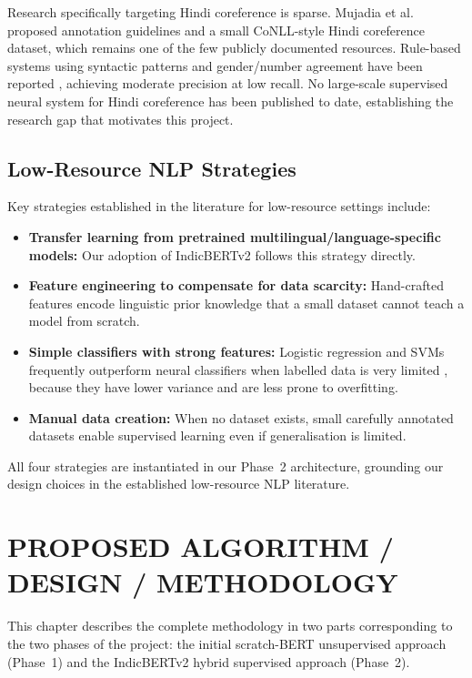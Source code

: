 \documentclass[12pt,a4paper]{report}
\begin{document}
Research specifically targeting Hindi coreference is sparse. Mujadia et al.\ \cite{mujadia2016hindi} proposed annotation guidelines and a small CoNLL-style Hindi coreference dataset, which remains one of the few publicly documented resources. Rule-based systems using syntactic patterns and gender/number agreement have been reported \cite{dakwale2013anaphora}, achieving moderate precision at low recall. No large-scale supervised neural system for Hindi coreference has been published to date, establishing the research gap that motivates this project.

\section{Low-Resource NLP Strategies}

Key strategies established in the literature for low-resource settings \cite{hedderich2021survey} include:

\begin{itemize}
    \item \textbf{Transfer learning from pretrained multilingual/language-specific models:} Our adoption of IndicBERTv2 follows this strategy directly.
    \item \textbf{Feature engineering to compensate for data scarcity:} Hand-crafted features encode linguistic prior knowledge that a small dataset cannot teach a model from scratch.
    \item \textbf{Simple classifiers with strong features:} Logistic regression and SVMs frequently outperform neural classifiers when labelled data is very limited \cite{lappin1994algorithm}, because they have lower variance and are less prone to overfitting.
    \item \textbf{Manual data creation:} When no dataset exists, small carefully annotated datasets enable supervised learning even if generalisation is limited.
\end{itemize}

All four strategies are instantiated in our Phase~2 architecture, grounding our design choices in the established low-resource NLP literature.


\chapter{PROPOSED ALGORITHM / DESIGN / METHODOLOGY}

This chapter describes the complete methodology in two parts corresponding to the two phases of the project: the initial scratch-BERT unsupervised approach (Phase~1) and the IndicBERTv2 hybrid supervised approach (Phase~2).
\end{document}
